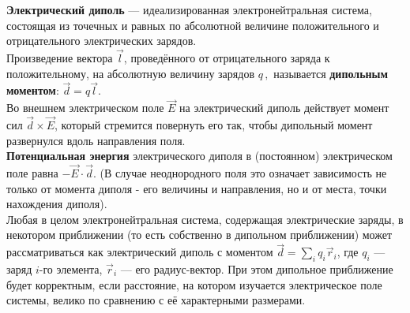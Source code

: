 \documentclass[__minimum__.tex]{subfiles}
\begin{document}

\textbf{Электрический диполь} — идеализированная электронейтральная система, состоящая из точечных и равных по абсолютной величине положительного и отрицательного электрических зарядов.\\

Произведение вектора $ \vec l$, проведённого от отрицательного заряда к положительному, на абсолютную величину зарядов $ q\,,$ называется \textbf{дипольным моментом}: $\vec d=q\vec l$.\\

Во внешнем электрическом поле $\vec E$ на электрический диполь действует момент сил ${\vec d}\times{\vec E}$, который стремится повернуть его так, чтобы дипольный момент развернулся вдоль направления поля.\\

\textbf{Потенциальная энергия} электрического диполя в (постоянном) электрическом поле равна $-{\vec E}\cdot{\vec d}$. (В случае неоднородного поля это означает зависимость не только от момента диполя - его величины и направления, но и от места, точки нахождения диполя).\\


Любая в целом электронейтральная система, содержащая электрические заряды, в некотором приближении (то есть собственно в дипольном приближении) может рассматриваться как электрический диполь с моментом $\vec d = \sum_i q_i {\vec r}_i$, где $q_{i}$ — заряд $i$-го элемента, ${\vec r}_i$ — его радиус-вектор. При этом дипольное приближение будет корректным, если расстояние, на котором изучается электрическое поле системы, велико по сравнению с её характерными размерами.
\\ 
\end{document}
